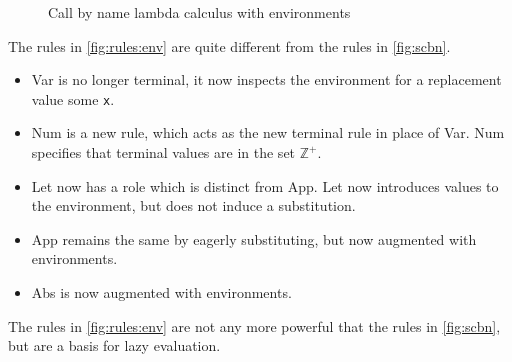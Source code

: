 \documentclass[11pt,oneside,a4paper]{report}
\begin{document}
\begin{figure}[ht]
\begin{mdframed}[style=bigbox]
\begin{subfigure}[b]{1\textwidth}
          \vspace*{0.4cm}
            \begin{prooftree}
            \end{prooftree}   
            \caption{}
          \label{fig:rules:env:var}
        \end{subfigure}
    \end{mdframed}
    \caption{Call by name lambda calculus with environments}
    \label{fig:rules:env}
\end{figure}
The rules in \autoref{fig:rules:env} are quite different from the rules in \autoref{fig:scbn}.
\begin{itemize}
  \item Var is no longer terminal, it now inspects the environment for a replacement value some \texttt{x}.
  \item Num is a new rule, which acts as the new terminal rule in place of Var.
    Num specifies that terminal values are in the set $\mathbb{Z^+}$.
  \item Let now has a role which is distinct from App.
    Let now introduces values to the environment, but does not induce a substitution.
  \item App remains the same by eagerly substituting, but now augmented with environments.
  \item Abs is now augmented with environments.
\end{itemize}
The rules in \autoref{fig:rules:env} are not any more powerful that the rules in \autoref{fig:scbn}, but are a basis for lazy evaluation.
\end{document}
